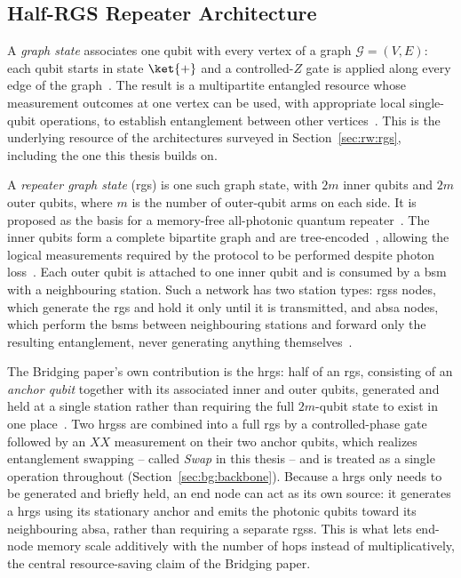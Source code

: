 \subsection{Half-RGS Repeater Architecture}
\label{sec:bg:hrgs}

A \emph{graph state} associates one qubit with every vertex of a graph $\mathcal{G}=(V,E)$: each qubit starts in state $\ket{+}$ and a controlled-$Z$ gate is applied along every edge of the graph~\cite{Briegel2001Persistent,Raussendorf2003Measurementbased,Hein2004Multiparty,Hein2006Entanglement}. The result is a multipartite entangled resource whose measurement outcomes at one vertex can be used, with appropriate local single-qubit operations, to establish entanglement between other vertices~\cite{Raussendorf2002oneway,Raussendorf2003Measurementbased,Zwerger2012Measurementbased}. This is the underlying resource of the architectures surveyed in Section~\ref{sec:rw:rgs}, including the one this thesis builds on.

A \emph{repeater graph state} (\Gls{rgs}) is one such graph state, with $2m$ inner qubits and $2m$ outer qubits, where $m$ is the number of outer-qubit arms on each side. It is proposed as the basis for a memory-free all-photonic quantum repeater~\cite{Azuma2015All}. The inner qubits form a complete bipartite graph and are tree-encoded~\cite{Varnava2006Loss}, allowing the logical measurements required by the protocol to be performed despite photon loss~\cite{Varnava2008How}. Each outer qubit is attached to one inner qubit and is consumed by a \Gls{bsm} with a neighbouring station. Such a network has two station types: \Gls{rgss} nodes, which generate the \Gls{rgs} and hold it only until it is transmitted, and \Gls{absa} nodes, which perform the \Glspl{bsm} between neighbouring stations and forward only the resulting entanglement, never generating anything themselves~\cite{Azuma2015All,Benchasattabuse2026Bridging}.

The Bridging paper's own contribution is the \Gls{hrgs}: half of an \Gls{rgs}, consisting of an \emph{anchor qubit} together with its associated inner and outer qubits, generated and held at a single station rather than requiring the full $2m$-qubit state to exist in one place~\cite{Benchasattabuse2026Bridging}. Two \Glspl{hrgs} are combined into a full \Gls{rgs} by a controlled-phase gate followed by an $XX$ measurement on their two anchor qubits, which realizes entanglement swapping -- called \emph{Swap} in this thesis -- and is treated as a single operation throughout (Section~\ref{sec:bg:backbone}). Because a \Gls{hrgs} only needs to be generated and briefly held, an end node can act as its own source: it generates a \Gls{hrgs} using its stationary anchor and emits the photonic qubits toward its neighbouring \Gls{absa}, rather than requiring a separate \Gls{rgss}. This is what lets end-node memory scale additively with the number of hops instead of multiplicatively, the central resource-saving claim of the Bridging paper.

